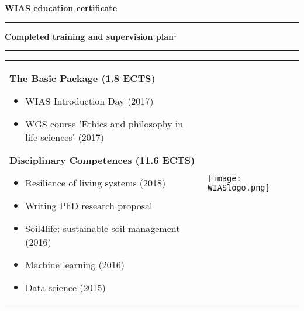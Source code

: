 
{\Large\textbf{WIAS education certificate}}
\vspace{4mm}
\hrule
\textbf{Completed training and supervision plan$^1$}
\vspace{2mm}
\hrule
\begin{tabular}[t]{l l}
\begin{minipage}{0.73\textwidth}
\textbf{The Basic Package (1.8 ECTS)}
\begin{itemize}[nolistsep, topsep=0cm] %
    \item WIAS Introduction Day (2017)
    \item WGS course 'Ethics and philosophy in life sciences' (2017)
\end{itemize}
\vspace{2mm}
\textbf{Disciplinary Competences (11.6 ECTS)}
\begin{itemize}[nolistsep,topsep=0cm]
    \item Resilience of living systems (2018)
    \item Writing PhD research proposal
    \item Soil4life: sustainable soil management (2016)
    \item Machine learning (2016)
    \item Data science (2015)
\end{itemize}
\vspace{1mm}

\end{minipage}
&
\texttt{[image: WIASlogo.png]}
\end{tabular}

